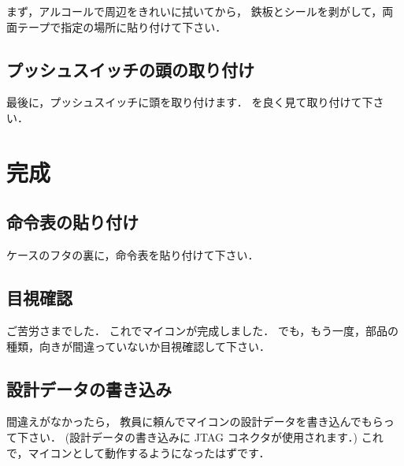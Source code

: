 まず，アルコールで周辺をきれいに拭いてから，
鉄板とシールを剥がして，両面テープで指定の場所に貼り付けて下さい．

\subsection{プッシュスイッチの頭の取り付け}
最後に，プッシュスイッチに頭を取り付けます．
を良く見て取り付けて下さい．

\newpage
\section{完成}

\subsection{命令表の貼り付け}
ケースのフタの裏に，命令表を貼り付けて下さい．


\subsection{目視確認}
ご苦労さまでした．
これでマイコンが完成しました．
でも，もう一度，部品の種類，向きが間違っていないか目視確認して下さい．


\subsection{設計データの書き込み}
間違えがなかったら，
教員に頼んでマイコンの設計データを書き込んでもらって下さい．
(設計データの書き込みに JTAG コネクタが使用されます．)
これで，マイコンとして動作するようになったはずです．

